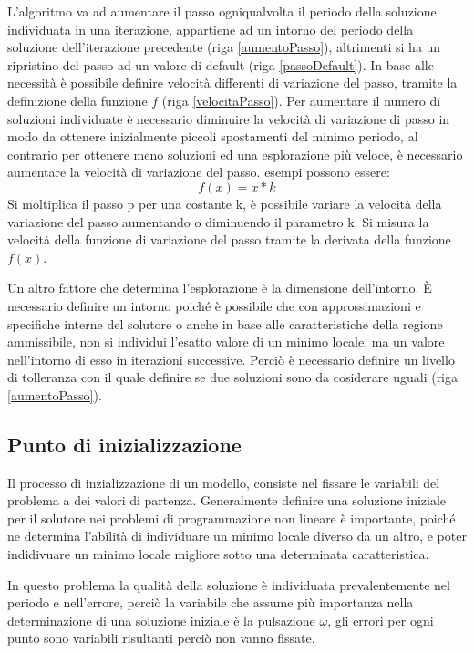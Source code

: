 \documentclass[a4paper,12pt]{report}
\begin{document}
L'algoritmo va ad aumentare il passo ogniqualvolta il periodo della soluzione individuata in una iterazione, appartiene ad un intorno del periodo della soluzione dell'iterazione precedente (riga \ref{aumentoPasso}), altrimenti si ha un ripristino del passo ad un valore di default (riga \ref{passoDefault}). In base alle necessità è possibile definire velocità differenti di variazione del passo, tramite la definizione della funzione $f$ (riga \ref{velocitaPasso}). Per aumentare il numero di soluzioni individuate è necessario diminuire la velocità di variazione di passo in modo da ottenere inizialmente piccoli spostamenti del minimo periodo, al contrario per ottenere meno soluzioni ed una esplorazione più veloce, è necessario aumentare la velocità di variazione del passo. esempi possono essere:
\begin{equation}
  \label{velocitaPassoEspl}
f(x) = x * k
\end{equation}
Si moltiplica il passo p per una costante k, è possibile variare la velocità della variazione del passo aumentando o diminuendo il parametro k. Si misura la velocità della funzione di variazione del passo tramite la derivata della funzione $f(x)$.

Un altro fattore che determina l'esplorazione è la dimensione dell'intorno. È necessario definire un intorno poiché è possibile che con approssimazioni e specifiche interne del solutore o anche in base alle caratteristiche della regione ammissibile, non si individui l'esatto valore di un minimo locale, ma un valore nell'intorno di esso in iterazioni successive. Perciò è necessario definire un livello di tolleranza con il quale definire se due soluzioni sono da cosiderare uguali (riga \ref{aumentoPasso}).

\subsection{Punto di inizializzazione}
Il processo di inzializzazione di un modello, consiste nel fissare le variabili del problema a dei valori di partenza. Generalmente definire una soluzione iniziale per il solutore nei problemi di programmazione non lineare è importante, poiché ne determina l'abilità di individuare un minimo locale diverso da un altro, e poter indidivuare un minimo locale migliore sotto una determinata caratteristica.

In questo problema la qualità della soluzione è individuata prevalentemente nel periodo e nell'errore, perciò la variabile che assume più importanza nella determinazione di una soluzione iniziale è la pulsazione $\omega$, gli errori per ogni punto sono variabili risultanti perciò non vanno fissate.
\end{document}
